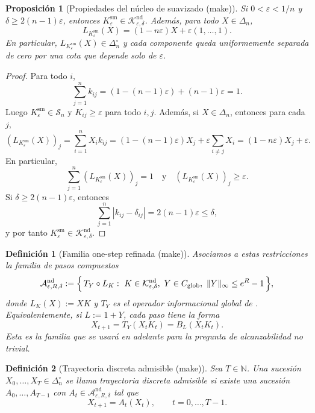﻿\documentclass[12pt]{article}
\newcommand{\fuente}[1]{\textnormal{(#1)}}
\newtheorem{definicion}{Definición}[section]
\newtheorem{proposicion}{Proposición}[section]
\begin{document}
\begin{proposicion}[Propiedades del núcleo de suavizado \fuente{make}]
Si \(0<\varepsilon<1/n\) y \(\delta\ge 2(n-1)\varepsilon\), entonces \(K_\varepsilon^{\mathrm{sm}}\in\mathcal K_{\varepsilon,\delta}^{\mathrm{nd}}\). Además, para todo \(X\in\Delta_n\),
\[
L_{K_\varepsilon^{\mathrm{sm}}}(X)
=(1-n\varepsilon)X+\varepsilon(1,\dots,1).
\]
En particular, \(L_{K_\varepsilon^{\mathrm{sm}}}(X)\in\Delta_n^\circ\) y cada componente queda uniformemente separada de cero por una cota que depende solo de \(\varepsilon\).
\end{proposicion}
\begin{proof}
Para todo \(i\),
\[
\sum_{j=1}^n k_{ij}
=(1-(n-1)\varepsilon)+(n-1)\varepsilon
=1.
\]
Luego \(K_\varepsilon^{\mathrm{sm}}\in\mathcal S_n\) y \(K_{ij}\ge\varepsilon\) para todo \(i,j\). Además, si \(X\in\Delta_n\), entonces para cada \(j\),
\[
(L_{K_\varepsilon^{\mathrm{sm}}}(X))_j
=\sum_{i=1}^n X_i k_{ij}
=(1-(n-1)\varepsilon)X_j+\varepsilon\sum_{i\ne j}X_i
=(1-n\varepsilon)X_j+\varepsilon.
\]
En particular,
\[
\sum_{j=1}^n (L_{K_\varepsilon^{\mathrm{sm}}}(X))_j=1
\quad\text{y}\quad
(L_{K_\varepsilon^{\mathrm{sm}}}(X))_j\ge \varepsilon.
\]
Si \(\delta\ge 2(n-1)\varepsilon\), entonces
\[
\sum_{j=1}^n |k_{ij}-\delta_{ij}|
=2(n-1)\varepsilon\le\delta,
\]
y por tanto \(K_\varepsilon^{\mathrm{sm}}\in\mathcal K_{\varepsilon,\delta}^{\mathrm{nd}}\).
\end{proof}

\begin{definicion}[Familia one-step refinada \fuente{make}]
Asociamos a estas restricciones la familia de pasos compuestos
\[
\mathcal A_{\varepsilon,R,\delta}^{\mathrm{nd}}
:=
\Bigl\{\,T_Y\circ L_K:\ K\in\mathcal K_{\varepsilon,\delta}^{\mathrm{nd}},\ Y\in C_{\mathrm{glob}},\ \|Y\|_\infty\le e^R-1\,\Bigr\},
\]
donde \(L_K(X):=XK\) y \(T_Y\) es el operador informacional global de \cite{ControlInformacional2026}. Equivalentemente, si \(L:=1+Y\), cada paso tiene la forma
\[
X_{t+1}=T_Y(X_tK_t)=B_L(X_tK_t).
\]
Esta es la familia que se usará en adelante para la pregunta de alcanzabilidad no trivial.
\end{definicion}


\begin{definicion}[Trayectoria discreta admisible \fuente{make}]
Sea \(T\in\mathbb N\). Una sucesión \(X_0,\dots,X_T\in\Delta_n^\circ\) se llama \emph{trayectoria discreta admisible} si existe una sucesión \(A_0,\dots,A_{T-1}\) con \(A_t\in\mathcal A_{\varepsilon,R,\delta}^{\mathrm{nd}}\) tal que
\[
X_{t+1}=A_t(X_t),\qquad t=0,\dots,T-1.
\]
\end{definicion}
\end{document}
